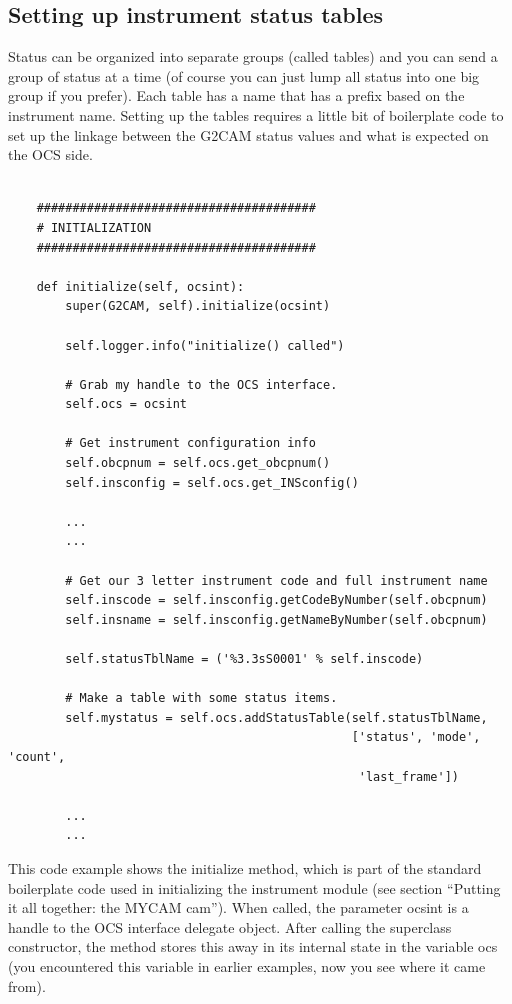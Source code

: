 \documentclass[11pt]{report}
\begin{document}
\subsection{Setting up instrument status tables}
Status can be organized into separate groups (called tables) and you can
send a group of status at a time (of course you can just lump all status
into one big group if you prefer).  Each table has a name that has a
prefix based on the instrument name.  Setting up the tables requires a
little bit of boilerplate code to set up the linkage between the G2CAM
status values and what is expected on the OCS side. 
\begin{verbatim}

    #######################################
    # INITIALIZATION
    #######################################

    def initialize(self, ocsint):
        super(G2CAM, self).initialize(ocsint)

        self.logger.info("initialize() called")

        # Grab my handle to the OCS interface.
        self.ocs = ocsint

        # Get instrument configuration info
        self.obcpnum = self.ocs.get_obcpnum()
        self.insconfig = self.ocs.get_INSconfig()

        ...
        ...

        # Get our 3 letter instrument code and full instrument name
        self.inscode = self.insconfig.getCodeByNumber(self.obcpnum)
        self.insname = self.insconfig.getNameByNumber(self.obcpnum)
        
        self.statusTblName = ('%3.3sS0001' % self.inscode)

        # Make a table with some status items.
        self.mystatus = self.ocs.addStatusTable(self.statusTblName,
                                                ['status', 'mode', 'count',
                                                 'last_frame'])
        
        ...
        ...

\end{verbatim}
This code example shows the initialize method, which is part of the
standard boilerplate code used in initializing the instrument module
(see section ``Putting it all together: the MYCAM cam''). When called, the
parameter ocsint is a handle to the OCS interface delegate object. After
calling the superclass constructor, the method stores this away in its
internal state in the variable ocs (you encountered this variable in
earlier examples, now you see where it came from). 
\end{document}
